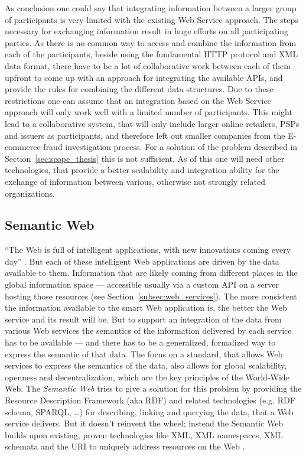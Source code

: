As conclusion one could say that integrating information between a larger group of participants is very limited with the existing Web Service approach. The steps necessary for exchanging information result in huge efforts on all participating parties. As there is no common way to access and combine the information from each of the participants, beside using the fundamental \gls{HTTP} protocol and \gls{XML} data format, there have to be a lot of collaborative work between each of them upfront to come up with an approach for integrating the available \gls{API}s, and provide the rules for combining the different data structures. Due to these restrictions one can assume that an integration based on the Web Service approach will only work well with a limited number of participants. This might lead to a collaborative system, that will only include larger online retailers, \gls{PSP}s and issuers as participants, and therefore left out smaller companies from the \gls{E-commerce} fraud investigation process. For a solution of the problem described in Section~\ref{sec:scope_thesis} this is not sufficient. As of this one will need other technologies, that provide a better scalability and integration ability for the exchange of information between various, otherwise not strongly related organizations.


\subsection{Semantic Web}
\label{subsec:web_data}

``The Web is full of intelligent applications, with new innovations coming every day'' \citep{allemang2011semantic}. But each of these intelligent Web applications are driven by the data available to them. Information that are likely coming from different places in the global information space — accessible usually via a custom \gls{API} on a server hosting those resources (see Section~\ref{subsec:web_services}). The more consistent the information available to the smart Web application is, the better the Web service and its result will be. But to support an integration of the data from various Web services the semantics of the information delivered by each service has to be available — and there has to be a generalized, formalized way to express the semantic of that data. The focus on a standard, that allows Web services to express the semantics of the data, also allows for global scalability, openness and decentralization, which are the key principles of the World-Wide Web. The \emph{Semantic Web} tries to give a solution for this problem by providing the Resource Description Framework (aka \gls{RDF}) and related technologies (e.g. RDF schema, \gls{SPARQL}, \ldots) for describing, linking and querying the data, that a Web service delivers. But it doesn’t reinvent the wheel; instead the Semantic Web builds upon existing, proven technologies like \gls{XML}, XML namespaces, XML schemata and the \gls{URI} to uniquely address resources on the Web \citep{allemang2011semantic}. \\

